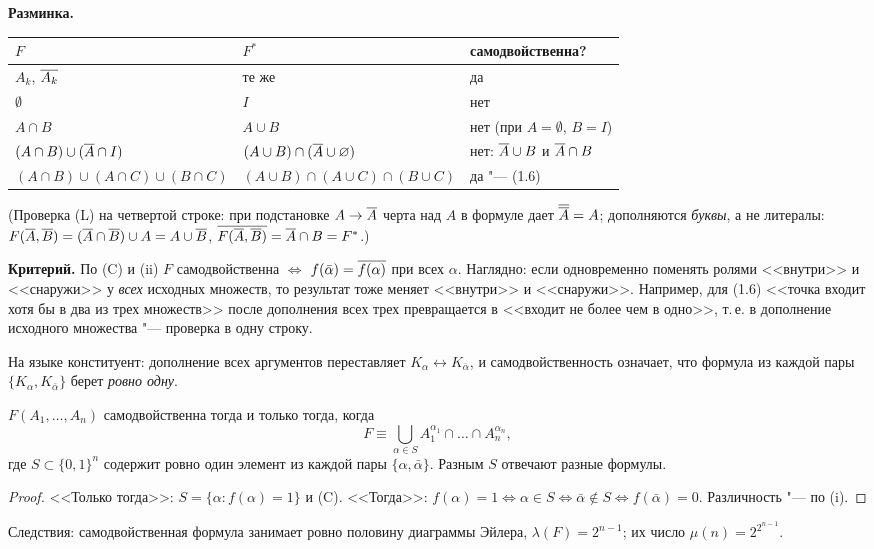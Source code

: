 \begin{solution}[2 (\S\,3)]
\textbf{Разминка.}
\begin{center}\small
\begin{tabular}{lll}
\toprule
$F$ & $F^*$ & самодвойственна?\\ \midrule
$A_k$, $\overline{A_k}$ & те же & да\\
$\emptyset$ & $I$ & нет\\
$A\cap B$ & $A\cup B$ & нет (при $A=\emptyset$, $B=I$)\\
$(A\cap B)\cup(\overline{A}\cap I)$ & $(A\cup B)\cap(\overline{A}\cup\varnothing)$ & нет: $\overline{A}\cup B$ и $\overline{A}\cap B$\\
$(A\cap B)\cup(A\cap C)\cup(B\cap C)$ & $(A\cup B)\cap(A\cup C)\cap(B\cup C)$ & да "--- (1.6)\\
\bottomrule
\end{tabular}
\end{center}
(Проверка (L) на четвертой строке: при подстановке $A\to\overline{A}$ черта над
$A$ в формуле дает $\overline{\overline{A}}=A$; дополняются \emph{буквы}, а не
литералы: $F(\overline{A},\overline{B})=(\overline{A}\cap\overline{B})\cup A=A\cup\overline{B}$,
$\overline{F(\overline{A},\overline{B})}=\overline{A}\cap B=F^*$.)

\textbf{Критерий.} По (C) и (ii) $F$ самодвойственна $\iff$
$f(\bar\alpha)=\overline{f(\alpha)}$ при всех $\alpha$. Наглядно: если
одновременно поменять ролями <<внутри>> и <<снаружи>> у \emph{всех}
исходных множеств, то результат тоже меняет <<внутри>> и <<снаружи>>.
Например, для (1.6) <<точка входит хотя бы в два из трех множеств>> после
дополнения всех трех превращается в <<входит не более чем в одно>>, т.\,е.
в дополнение исходного множества "--- проверка в одну строку.

На языке конституент: дополнение всех аргументов переставляет
$K_\alpha\leftrightarrow K_{\bar\alpha}$, и самодвойственность означает,
что формула из каждой пары $\{K_\alpha,K_{\bar\alpha}\}$ берет \emph{ровно
одну}.

\begin{theorem*}[описание]
$F(A_1,\dots,A_n)$ самодвойственна тогда и только тогда, когда
\[
F\equiv\bigcup_{\alpha\in S}A_1^{\alpha_1}\cap\dots\cap A_n^{\alpha_n},
\]
где $S\subset\{0,1\}^n$ содержит ровно один элемент из каждой пары
$\{\alpha,\bar\alpha\}$. Разным $S$ отвечают разные формулы.
\end{theorem*}
\begin{proof}
<<Только тогда>>: $S=\{\alpha:f(\alpha)=1\}$ и (C). <<Тогда>>:
$f(\alpha)=1\iff\alpha\in S\iff\bar\alpha\notin S\iff f(\bar\alpha)=0$.
Различность "--- по (i).
\end{proof}
Следствия: самодвойственная формула занимает ровно половину диаграммы
Эйлера, $\lambda(F)=2^{n-1}$; их число $\mu(n)=2^{2^{n-1}}$.


\end{solution}
